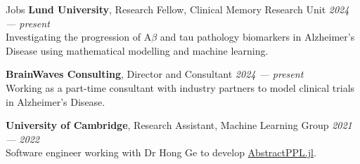 \begin{rSection}{Jobs}
    {\bf Lund University}, Research Fellow, Clinical Memory Research Unit  \hfill {\em 2024 — present} \\
    Investigating the progression of A$\beta$ and tau pathology biomarkers in
    Alzheimer's Disease using mathematical modelling and machine learning. 
     
    {\bf BrainWaves Consulting}, Director and Consultant  \hfill {\em 2024 — present} \\
    Working as a part-time consultant with industry partners to model
    clinical trials in Alzheimer's Disease.


    {\bf University of Cambridge}, Research Assistant, Machine Learning Group  \hfill {\em 2021 — 2022} \\
    Software engineer working with Dr Hong Ge to develop
    \href{https://github.com/TuringLang/AbstractPPL.jl}{AbstractPPL.jl}.
\end{rSection}
    